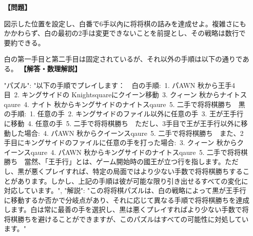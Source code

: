 \documentclass[10pt,a4paper,oneside,openany]{ltjsbook}
\begin{document}
\begin{tcolorbox}[colback=softblue,colframe=primaryblue,title=\textbf{第 350 問：THE FORSAKEN KING.},arc=2mm,boxrule=1pt,breakable]
\textbf{【問題】}\par\vspace{0.3em}
図示した位置を設定し、白番で6手以內に将将棋の詰みを達成せよ。複雑さにもかかわらず、白の最初の2手は変更できないことを前提とし、その戦略は数行で要約できる。

白の第一手目と第二手目は固定されているが、それ以外の手順は以下の通りである。
\tcblower
\textbf{【解答・数理解説】}\par\vspace{0.3em}
{
    "パズル": "以下の手順でプレイします：\
\
白の手順:\
1. パAWN 秋から王手4目\
2. キングサイドの Knightsquareにクイーン移動\
3. クィーン 秋からナイトスqaure\
4. ナイト 秋からキングサイドのナイトスqaure\
5. 二手で将将棋勝ち\
\
黒の手順:\
1. 任意の手\
2. キングサイドのファイル以外に任意の手\
3. 王が王手行に移動\
4. 任意の手\
5. 二手で将将棋勝ち\
\
ただし、3手目で王が王手行以外に移動した場合:\
4. パAWN 秋からクイーンスqaure\
5. 二手で将将棋勝ち\
\
また、2手目にキングサイドのファイルに任意の手を打った場合:\
3. クィーン 秋からクイーンスqaure\
4. パAWN 秋からキングサイドのナイトスqaure\
5. 二手で将将棋勝ち\
\
當然、「王手行」とは、ゲーム開始時の國王が立つ行を指します。ただし、黒が悪くプレイすれば、特定の局面ではより少ない手数で将将棋勝ちすることがあります。しかし、上記の手順は彼が可能な限り引き出せるすべての変化に対応しています。",
    "解説": "この将将棋パズルは、白の戦略によって黒が王手行に移動するか否かで分岐点があり、それに応じて異なる手順で将将棋勝ちを達成します。白は常に最善の手を選択し、黒は悪くプレイすればより少ない手数で将将棋勝ちを避けることができますが、このパズルはすべての可能性に対処しています。"
}
\end{tcolorbox}
\end{document}
